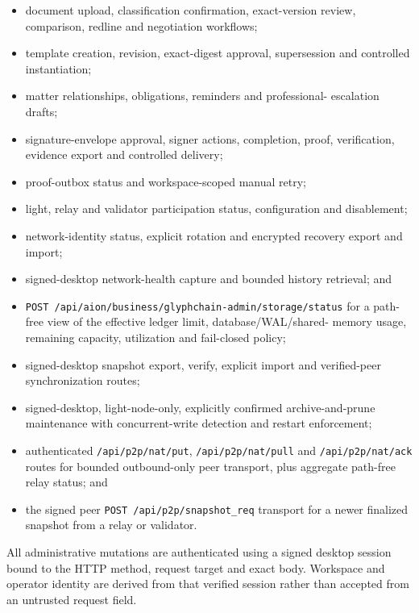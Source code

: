 \begin{itemize}
  \item document upload, classification confirmation, exact-version review,
        comparison, redline and negotiation workflows;
  \item template creation, revision, exact-digest approval, supersession and
        controlled instantiation;
  \item matter relationships, obligations, reminders and professional-
        escalation drafts;
  \item signature-envelope approval, signer actions, completion, proof,
        verification, evidence export and controlled delivery;
  \item proof-outbox status and workspace-scoped manual retry;
  \item light, relay and validator participation status, configuration and
        disablement;
  \item network-identity status, explicit rotation and encrypted recovery export
        and import;
  \item signed-desktop network-health capture and bounded history retrieval; and
  \item \texttt{POST /api/aion/business/glyphchain-admin/storage/status}
        for a path-free view of the effective ledger limit, database/WAL/shared-
        memory usage, remaining capacity, utilization and fail-closed policy;
  \item signed-desktop snapshot export, verify, explicit import and verified-peer
        synchronization routes;
  \item signed-desktop, light-node-only, explicitly confirmed archive-and-prune
        maintenance with concurrent-write detection and restart enforcement;
  \item authenticated \texttt{/api/p2p/nat/put},
        \texttt{/api/p2p/nat/pull} and \texttt{/api/p2p/nat/ack} routes for
        bounded outbound-only peer transport, plus aggregate path-free relay
        status; and
  \item the signed peer \texttt{POST /api/p2p/snapshot\_req} transport for a
        newer finalized snapshot from a relay or validator.
\end{itemize}

All administrative mutations are authenticated using a signed desktop session
bound to the HTTP method, request target and exact body. Workspace and operator
identity are derived from that verified session rather than accepted from an
untrusted request field.

